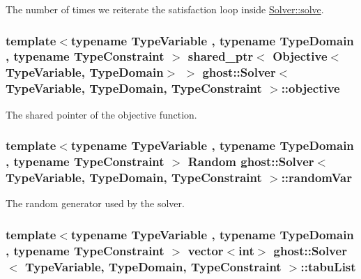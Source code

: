 The number of times we reiterate the satisfaction loop inside \hyperlink{classghost_1_1Solver_a5d15e316f5a4bb8a33c6781058ad0307}{Solver\-::solve}. 

\hypertarget{classghost_1_1Solver_a4fd74bd68d0ea253fd35adad697f964d}{
\subsubsection[{objective}]{\setlength{\rightskip}{0pt plus 5cm}template$<$typename Type\-Variable , typename Type\-Domain , typename Type\-Constraint $>$ shared\-\_\-ptr$<$ {\bf Objective}$<$Type\-Variable, Type\-Domain$>$ $>$ {\bf ghost\-::\-Solver}$<$ Type\-Variable, Type\-Domain, Type\-Constraint $>$\-::objective\hspace{0.3cm}{\ttfamily [private]}}}\label{classghost_1_1Solver_a4fd74bd68d0ea253fd35adad697f964d}


The shared pointer of the objective function. 

\hypertarget{classghost_1_1Solver_acec87a0a0adcc3a8d794a1ff84718201}{
\subsubsection[{random\-Var}]{\setlength{\rightskip}{0pt plus 5cm}template$<$typename Type\-Variable , typename Type\-Domain , typename Type\-Constraint $>$ {\bf Random} {\bf ghost\-::\-Solver}$<$ Type\-Variable, Type\-Domain, Type\-Constraint $>$\-::random\-Var\hspace{0.3cm}{\ttfamily [private]}}}\label{classghost_1_1Solver_acec87a0a0adcc3a8d794a1ff84718201}


The random generator used by the solver. 

\hypertarget{classghost_1_1Solver_aa5c12894a6fbd524fb33906c8f3fbcae}{
\subsubsection[{tabu\-List}]{\setlength{\rightskip}{0pt plus 5cm}template$<$typename Type\-Variable , typename Type\-Domain , typename Type\-Constraint $>$ vector$<$int$>$ {\bf ghost\-::\-Solver}$<$ Type\-Variable, Type\-Domain, Type\-Constraint $>$\-::tabu\-List\hspace{0.3cm}{\ttfamily [private]}}}\label{classghost_1_1Solver_aa5c12894a6fbd524fb33906c8f3fbcae}


